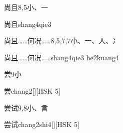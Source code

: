 \begin{entry}{尚且}{8,5}{⼩、⼀}
  \begin{phonetics}{尚且}{shang4qie3}
  \end{phonetics}
\end{entry}

\begin{entry}{尚且……何况……}{8,5,7,7}{⼩、⼀、⼈、⼎}
  \begin{phonetics}{尚且……何况……}{shang4qie3 he2kuang4}
  \end{phonetics}
\end{entry}

\begin{entry}{尝}{9}{⼩}
  \begin{phonetics}{尝}{chang2}[][HSK 5]
  \end{phonetics}
\end{entry}

\begin{entry}{尝试}{9,8}{⼩、⾔}
  \begin{phonetics}{尝试}{chang2shi4}[][HSK 5]
  \end{phonetics}
\end{entry}


